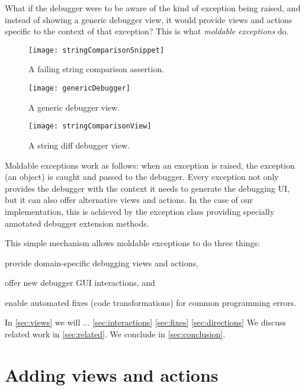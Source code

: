 \documentclass[sigplan,anonymous,review,10pt]{acmart}
\begin{document}
What if the debugger were to be aware of the kind of exception being raised, and instead of showing a generic debugger view, it would provide views and actions specific to the context of that exception?
This is what \emph{moldable exceptions} do.


\begin{figure}[h]
  \texttt{[image: stringComparisonSnippet]}
  \caption{A failing string comparison assertion.}
  \label{fig:stringComparisonSnippet}
\end{figure}

\begin{figure}[h]
  \texttt{[image: genericDebugger]}
  \caption{A generic debugger view.}
  \label{fig:genericDebugger}
\end{figure}

\begin{figure}[h]
  \texttt{[image: stringComparisonView]}
  \caption{A string diff debugger view.}
  \label{fig:stringComparisonView}
\end{figure}

Moldable exceptions work as follows: when an exception is raised, the exception (an object) is caught and passed to the debugger.
Every exception not only provides the debugger with the context it needs to generate the debugging UI, but it can also offer alternative views and actions.
In the case of our implementation, this is achieved by the exception class providing specially annotated debugger extension methods.

This simple mechanism allows moldable exceptions to do three things:
\begin{inparaenum}[(i)]
	\item provide domain-specific debugging views and actions,
	\item offer new debugger GUI interactions, and
	\item enable automated fixes (code transformations) for common programming errors.
\end{inparaenum}    

In \autoref{sec:views} we will ...
\autoref{sec:interactions}
\autoref{sec:fixes}
\autoref{sec:directions}
We discuss related work in \autoref{sec:related}.
We conclude in \autoref{sec:conclusion}.

\section{Adding views and actions}\label{sec:views}
\end{document}
